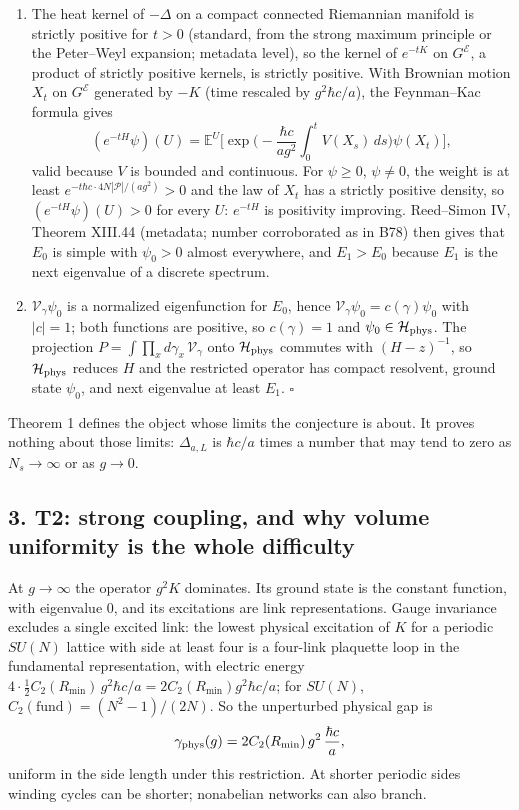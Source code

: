 \documentclass[11pt,a4paper]{article}
\begin{document}
\begin{enumerate}
\def\labelenumi{(\arabic{enumi})}
\setcounter{enumi}{1}
\item
  The heat kernel of \(-\Delta\) on a compact connected Riemannian
  manifold is strictly positive for \(t>0\) (standard, from the strong
  maximum principle or the Peter--Weyl expansion; metadata level), so
  the kernel of \(e^{-tK}\) on \(G^{\mathcal E}\), a product of strictly
  positive kernels, is strictly positive. With Brownian motion \(X_t\)
  on \(G^{\mathcal E}\) generated by \(-K\) (time rescaled by
  \(g^2\hbar c/a\)), the Feynman--Kac formula gives
  \[(e^{-tH}\psi)(U)=\mathbb E^U\Big[\exp\Big(-\frac{\hbar c}{ag^2}\int_0^tV(X_s)\,ds\Big)\psi(X_t)\Big],\]
  valid because \(V\) is bounded and continuous. For \(\psi\ge0\),
  \(\psi\ne0\), the weight is at least
  \(e^{-t\hbar c\cdot4N|\mathcal P|/(ag^2)}>0\) and the law of \(X_t\)
  has a strictly positive density, so \((e^{-tH}\psi)(U)>0\) for every
  \(U\): \(e^{-tH}\) is positivity improving. Reed--Simon IV, Theorem
  XIII.44 (metadata; number corroborated as in B78) then gives that
  \(E_0\) is simple with \(\psi_0>0\) almost everywhere, and \(E_1>E_0\)
  because \(E_1\) is the next eigenvalue of a discrete spectrum.
\item
  \(\mathcal V_\gamma\psi_0\) is a normalized eigenfunction for \(E_0\),
  hence \(\mathcal V_\gamma\psi_0=c(\gamma)\psi_0\) with \(|c|=1\); both
  functions are positive, so \(c(\gamma)=1\) and
  \(\psi_0\in\mathcal H_{\rm phys}\). The projection
  \(P=\int\prod_x d\gamma_x\,\mathcal V_\gamma\) onto
  \(\mathcal H_{\rm phys}\) commutes with \((H-z)^{-1}\), so
  \(\mathcal H_{\rm phys}\) reduces \(H\) and the restricted operator
  has compact resolvent, ground state \(\psi_0\), and next eigenvalue at
  least \(E_1\). \(\square\)
\end{enumerate}

Theorem 1 defines the object whose limits the conjecture is about. It
proves nothing about those limits: \(\Delta_{a,L}\) is \(\hbar c/a\)
times a number that may tend to zero as \(N_s\to\infty\) or as
\(g\to0\).

\subsection{3. T2: strong coupling, and why volume uniformity is the
whole
difficulty}\label{t2-strong-coupling-and-why-volume-uniformity-is-the-whole-difficulty}

At \(g\to\infty\) the operator \(g^2K\) dominates. Its ground state is
the constant function, with eigenvalue \(0\), and its excitations are
link representations. Gauge invariance excludes a single excited link:
the lowest physical excitation of \(K\) for a periodic \(SU(N)\) lattice
with side at least four is a four-link plaquette loop in the fundamental
representation, with electric energy
\(4\cdot\tfrac12C_2(R_{\min})\,g^2\hbar c/a=2C_2(R_{\min})g^2\hbar c/a\);
for \(SU(N)\), \(C_2(\text{fund})=(N^2-1)/(2N)\). So the unperturbed
physical gap is
\[\gamma_{\rm phys}(g)=2C_2(R_{\min})\,g^2\,\frac{\hbar c}{a},\] uniform
in the side length under this restriction. At shorter periodic sides
winding cycles can be shorter; nonabelian networks can also branch.
\end{document}
